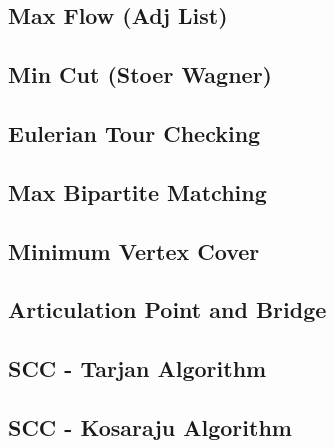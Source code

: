 \subsection{Max Flow (Adj List)}


\subsection{Min Cut (Stoer Wagner)}


\subsection{Eulerian Tour Checking}


\subsection{Max Bipartite Matching}


\subsection{Minimum Vertex Cover}


\subsection{Articulation Point and Bridge}


\subsection{SCC - Tarjan Algorithm}



\subsection{SCC - Kosaraju Algorithm}


